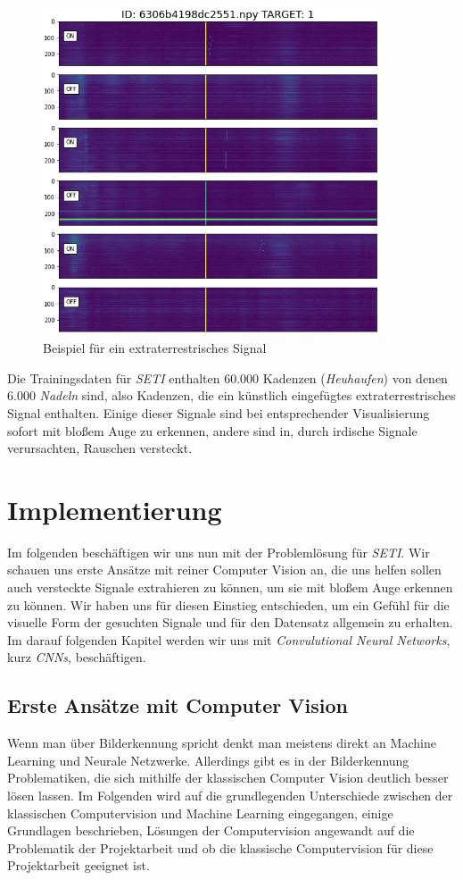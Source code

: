 \documentclass[11pt, a4paper]{article}
\begin{document}
\begin{figure}[t]
\centering
\includegraphics[width=0.9\textwidth]{"img/kadenz_pos_1.png"}
\caption{Beispiel für ein extraterrestrisches Signal}
\label{fig:kadenz_pos_1}
\end{figure}

Die Trainingsdaten für \emph{SETI} enthalten 60.000 Kadenzen (\emph{Heuhaufen}) von denen 6.000 \emph{Nadeln} sind, also Kadenzen, die ein künstlich eingefügtes extraterrestrisches Signal enthalten. Einige dieser Signale sind bei entsprechender Visualisierung sofort mit bloßem Auge zu erkennen, andere sind in, durch irdische Signale verursachten, Rauschen versteckt.


\section{Implementierung}
Im folgenden beschäftigen wir uns nun mit der Problemlösung für \emph{SETI}. Wir schauen uns erste Ansätze mit reiner Computer Vision an, die uns helfen sollen auch versteckte Signale extrahieren zu können, um sie mit bloßem Auge erkennen zu können. Wir haben uns für diesen Einstieg entschieden, um ein Gefühl für die visuelle Form der gesuchten Signale und für den Datensatz allgemein zu erhalten. Im darauf folgenden Kapitel werden wir uns mit \emph{Convulutional Neural Networks}, kurz \emph{CNNs}, beschäftigen.

\subsection{Erste Ansätze mit Computer Vision}
Wenn man über Bilderkennung spricht denkt man meistens direkt an Machine Learning und Neurale Netzwerke. Allerdings gibt es in der Bilderkennung Problematiken, die sich mithilfe der klassischen Computer Vision deutlich besser lösen lassen. Im Folgenden wird auf die grundlegenden Unterschiede zwischen der klassischen Computervision und Machine Learning eingegangen, einige Grundlagen beschrieben, Lösungen der Computervision angewandt auf die Problematik der Projektarbeit und ob die klassische Computervision für diese Projektarbeit geeignet ist.
\end{document}
